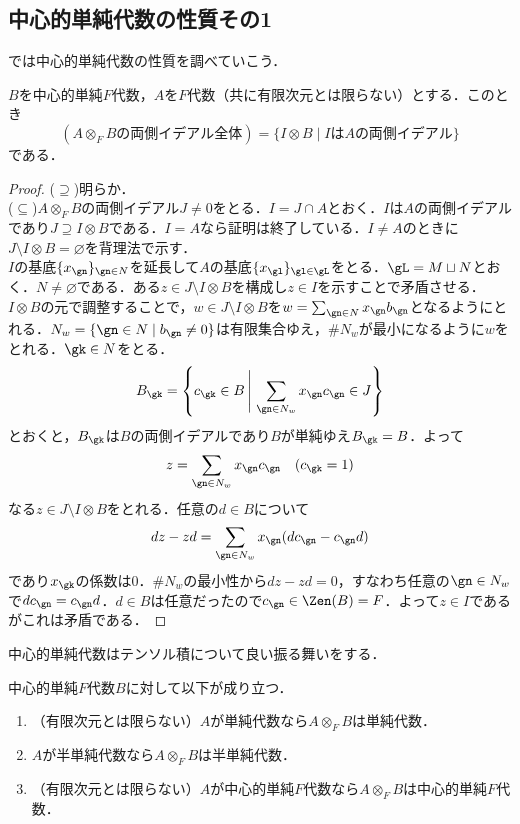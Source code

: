 \documentclass[a4paper,11pt]{jsarticle}
\begin{document}
\subsection{中心的単純代数の性質その1}
では中心的単純代数の性質を調べていこう．
\begin{lem}[CSAとのテンソル積の両側イデアル]\label{lem:csa_tensor_ideal}
  $B$を中心的単純$F$代数，$A$を$F$代数（共に有限次元とは限らない）とする．このとき
  \[
    (A\otimes_F Bの両側イデアル全体)=\{I\otimes B\mid I\text{は}A\text{の両側イデアル}\}
  \]
  である．
\end{lem}
\begin{proof}
  ($\supseteq$)明らか．\\
  ($\subseteq$)$A\otimes_F B$の両側イデアル$J\neq 0$をとる．$I=J\cap A$とおく．$I$は$A$の両側イデアルであり$J\supseteq I\otimes B$である．$I=A$なら証明は終了している．$I\neq A$のときに$J\setminus I\otimes B=\varnothing$を背理法で示す．\\
  $I$の基底$\{x_\gn\}_{\gn\in N}$を延長して$A$の基底$\{x_\gl\}_{\gl\in\gL}$をとる．$\gL=M\sqcup N$とおく．$N\neq\varnothing$である．ある$z\in J\setminus I\otimes B$を構成し$z\in I$を示すことで矛盾させる．$I\otimes B$の元で調整することで，$w\in J\setminus I\otimes B$を$w=\sum_{\gn\in N}x_\gn b_\gn$となるようにとれる．$N_w=\{\gn\in N\mid b_\gn\neq 0\}$は有限集合ゆえ，$\# N_w$が最小になるように$w$をとれる．$\gk\in N$をとる．
  \[
    B_\gk=\left\{c_\gk\in B\,\Bigg|\, \sum_{\gn\in N_w}x_\gn c_\gn\in J\right\}
  \]
  とおくと，$B_\gk$は$B$の両側イデアルであり$B$が単純ゆえ$B_\gk=B$．よって
  \[
    z=\sum_{\gn\in N_w}x_\gn c_\gn\quad(c_\gk=1)
  \]
  なる$z\in J\setminus I\otimes B$をとれる．任意の$d\in B$について
  \[
    dz-zd=\sum_{\gn\in N_w}x_\gn(dc_\gn-c_\gn d)
  \]
  であり$x_\gk$の係数は0．$\# N_w$の最小性から$dz-zd=0$，すなわち任意の$\gn\in N_w$で$dc_\gn=c_\gn d$．$d\in B$は任意だったので$c_\gn\in \Zen(B)=F$．よって$z\in I$であるがこれは矛盾である．
\end{proof}
中心的単純代数はテンソル積について良い振る舞いをする．
\begin{thm}
  \label{thm:csa_tensor_preserves_sa_ssa_csa}
  中心的単純$F$代数$B$に対して以下が成り立つ．
  \begin{enumerate}
    \item （有限次元とは限らない）$A$が単純代数なら$A\otimes_F B$は単純代数．
    \item $A$が半単純代数なら$A\otimes_F B$は半単純代数．
    \item （有限次元とは限らない）$A$が中心的単純$F$代数なら$A\otimes_F B$は中心的単純$F$代数．
  \end{enumerate}
\end{thm}
\end{document}
